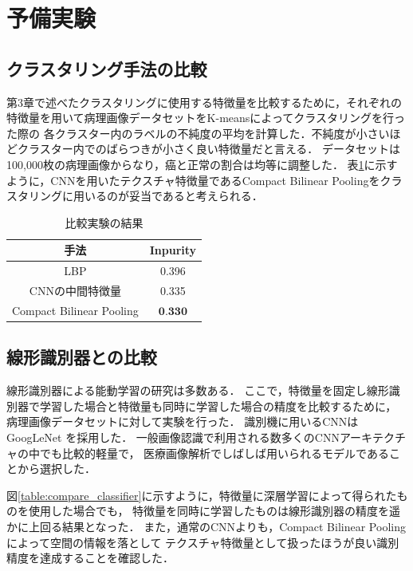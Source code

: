 \section{予備実験}

\subsection{クラスタリング手法の比較}
第3章で述べたクラスタリングに使用する特徴量を比較するために，それぞれの特徴量を用いて病理画像データセットをK-meansによってクラスタリングを行った際の
各クラスター内のラベルの不純度の平均を計算した．不純度が小さいほどクラスター内でのばらつきが小さく良い特徴量だと言える．
データセットは100,000枚の病理画像からなり，癌と正常の割合は均等に調整した．
表\ref{table:compare_feat}に示すように，CNNを用いたテクスチャ特徴量であるCompact Bilinear Poolingをクラスタリングに用いるのが妥当であると考えられる．

\begin{table}[h]
  \caption{\label{table:compare_feat}比較実験の結果}
  \center
  \begin{tabular}{c|c} \hline
     手法 & Inpurity \\ \hline
    LBP & 0.396 \\
    CNNの中間特徴量 & 0.335  \\ 
    Compact Bilinear Pooling & $\textbf{0.330}$ \\ \hline
  \end{tabular}
\end{table}

\subsection{線形識別器との比較}
線形識別器による能動学習の研究は多数ある．
ここで，特徴量を固定し線形識別器で学習した場合と特徴量も同時に学習した場合の精度を比較するために，
病理画像データセットに対して実験を行った．
識別機に用いるCNNはGoogLeNet \cite{szegedy2015going}を採用した．
一般画像認識で利用される数多くのCNNアーキテクチャの中でも比較的軽量で，
医療画像解析でしばしば用いられるモデルであることから選択した．

図\ref{table:compare_classifier}に示すように，特徴量に深層学習によって得られたものを使用した場合でも，
特徴量を同時に学習したものは線形識別器の精度を遥かに上回る結果となった．
また，通常のCNNよりも，Compact Bilinear Poolingによって空間の情報を落として
テクスチャ特徴量として扱ったほうが良い識別精度を達成することを確認した．

